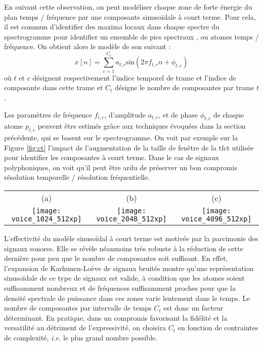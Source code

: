 En suivant cette observation, on peut modéliser chaque zone de forte énergie du plan temps / fréquence par une composante sinusoïdale à court terme. Pour cela, il est commun d'identifier des maxima locaux dans chaque spectre du spectrogramme pour identifier un ensemble de \og pics spectraux \fg, ou \og atomes \fg temps / fréquence. On obtient alors le modèle de son suivant :
\begin{equation}
  x[n] = \sum_{c=1}^{C_t} a_{t, c} \mathrm{sin}(2 \pi f_{t, c} n + \phi_{t, c})
  \label{eq:sct}
\end{equation}
où $t$ et $c$ désignent respectivement l'indice temporel de trame et l'indice de composante dans cette trame et $C_t$ désigne le nombre de composantes par trame $t$.

Les paramètres de fréquence $f_{t, c}$, d'amplitude $a_{t, c}$, et de phase $\phi_{t, c}$ de chaque atome $p_{t, c}$ peuvent être estimés grâce aux techniques évoquées dans la section précédente, qui se basent sur le spectrogramme. On voit par exemple sur la Figure \ref{fig:ct} l'impact de l'augmentation de la taille de fenêtre de la tfct utilisée pour identifier les composantes à court terme. Dans le cas de signaux polyphoniques, on voit qu'il peut être ardu de préserver un bon compromis résolution temporelle / résolution fréquentielle.

\begin{figure*}[t]
  \footnotesize
  \begin{tabular}{ccc}
    (a) & (b) & (c)  \\
  \texttt{[image: voice\_1024\_512xp]} &
  \texttt{[image: voice\_2048\_512xp]} &
  \texttt{[image: voice\_4096\_512xp]} \\
\end{tabular}
  \caption{Influence de la taille de fenêtre de la tfct utilisée pour estimer un modèle sinusoïdal à court terme d'un glissando de trombone. De gauche à droite, la taille est de 25 (a), 50 (b), et 100 ms (c), pour un pas d'avancement de 10 ms. Chaque point correspond  à une composante à court terme $p_{t, c}$ et sa taille est fonction de l'amplitude de la composante $a_{t, c}$.}
  \label{fig:ct}
\end{figure*}

L'effectivité du modèle sinusoïdal à court terme est motivée par la parcimonie des signaux sonores. Elle se révèle néanmoins très robuste à la réduction de cette dernière pour peu que le nombre de composantes soit suffisant. En effet, l'expansion de Karhunen-Lo\`eve de signaux bruités montre qu'une représentation sinusoïdale de ce type de signaux est valide, à condition que les atomes soient suffisamment nombreux et de fréquences suffisamment proches pour que la densité spectrale de puissance dans ces zones varie lentement dans le temps. Le nombre de composantes par intervalle de temps $C_t$ est donc un facteur déterminant. En pratique, dans un compromis favorisant la fidélité et la versatilité au détriment de l'expressivité, on choisira $C_t$ en fonction de contraintes de complexité, \textit{i.e.} le plus grand nombre possible.

